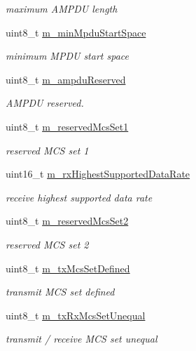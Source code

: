 \begin{DoxyCompactItemize}
\begin{DoxyCompactList}\small\item\em maximum A\+M\+P\+DU length \end{DoxyCompactList}\item 
uint8\+\_\+t \hyperlink{classns3_1_1HtCapabilities_a50cafdfb23fe314fda250335d49f8a73}{m\+\_\+min\+Mpdu\+Start\+Space}
\begin{DoxyCompactList}\small\item\em minimum M\+P\+DU start space \end{DoxyCompactList}\item 
uint8\+\_\+t \hyperlink{classns3_1_1HtCapabilities_ac525372deeb111d7fd8d0c1081cee493}{m\+\_\+ampdu\+Reserved}
\begin{DoxyCompactList}\small\item\em A\+M\+P\+DU reserved. \end{DoxyCompactList}\item 
uint8\+\_\+t \hyperlink{classns3_1_1HtCapabilities_af20ecacd0677b12a7cfee6c337ca24f9}{m\+\_\+reserved\+Mcs\+Set1}
\begin{DoxyCompactList}\small\item\em reserved M\+CS set 1 \end{DoxyCompactList}\item 
uint16\+\_\+t \hyperlink{classns3_1_1HtCapabilities_abcc5802e09b3001c75e4f25e34cfdec7}{m\+\_\+rx\+Highest\+Supported\+Data\+Rate}
\begin{DoxyCompactList}\small\item\em receive highest supported data rate \end{DoxyCompactList}\item 
uint8\+\_\+t \hyperlink{classns3_1_1HtCapabilities_a9bb3ce406ae93ec43eac0204a3bb118e}{m\+\_\+reserved\+Mcs\+Set2}
\begin{DoxyCompactList}\small\item\em reserved M\+CS set 2 \end{DoxyCompactList}\item 
uint8\+\_\+t \hyperlink{classns3_1_1HtCapabilities_a2be311804f4ccfcd0892218aa9739311}{m\+\_\+tx\+Mcs\+Set\+Defined}
\begin{DoxyCompactList}\small\item\em transmit M\+CS set defined \end{DoxyCompactList}\item 
uint8\+\_\+t \hyperlink{classns3_1_1HtCapabilities_a52305abc5d691050a73b26fdba6b8aea}{m\+\_\+tx\+Rx\+Mcs\+Set\+Unequal}
\begin{DoxyCompactList}\small\item\em transmit / receive M\+CS set unequal \end{DoxyCompactList}\item 

\end{DoxyCompactItemize}
